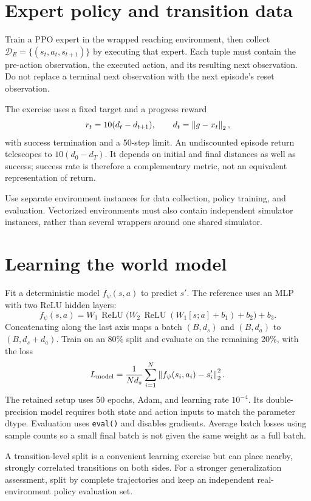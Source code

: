 


\section{Expert policy and transition data}
Train a PPO expert in the wrapped reaching environment, then collect
$\mathcal D_E=\{(s_t,a_t,s_{t+1})\}$ by executing that expert. Each tuple must
contain the pre-action observation, the executed action, and its resulting
next observation. Do not replace a terminal next observation with the next
episode's reset observation.

The exercise uses a fixed target and a progress reward
\[
 r_t=10(d_t-d_{t+1}),\qquad d_t=\left\lVert g-x_t\right\rVert_2,
\]
with success termination and a 50-step limit. An undiscounted episode return
telescopes to $10(d_0-d_T)$. It depends on initial and final distances as well
as success; success rate is therefore a complementary metric, not an
equivalent representation of return.

Use separate environment instances for data collection, policy training,
and evaluation. Vectorized environments must also contain independent
simulator instances, rather than several wrappers around one shared simulator.

\section{Learning the world model}
Fit a deterministic model $f_\psi(s,a)$ to predict $s'$. The reference uses
an MLP with two ReLU hidden layers:
\[
 f_\psi(s,a)=W_3\,\operatorname{ReLU}
    \big(W_2\,\operatorname{ReLU}(W_1[s;a]+b_1)+b_2\big)+b_3.
\]
Concatenating along the last axis maps a batch $(B,d_s)$ and $(B,d_a)$
to $(B,d_s+d_a)$. Train on an 80\% split and evaluate on the remaining
20\%, with the loss
\[
 L_{\rm model}=\frac{1}{N d_s}\sum_{i=1}^N
                      \left\lVert f_\psi(s_i,a_i)-s'_i\right\rVert_2^2.
\]
The retained setup uses 50 epochs, Adam, and learning rate $10^{-4}$.
Its double-precision model requires both state and action inputs to match
the parameter dtype. Evaluation uses \texttt{eval()} and disables gradients.
Average batch losses using sample counts so a small final batch is not
given the same weight as a full batch.

A transition-level split is a convenient learning exercise but can place
nearby, strongly correlated transitions on both sides. For a stronger
generalization assessment, split by complete trajectories and keep an
independent real-environment policy evaluation set.

